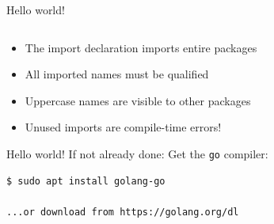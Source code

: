\documentclass[10pt]{beamer}
\begin{document}
	\begin{frame}[fragile]{Hello world!}
		\inputminted{go}{code/01_hello.go}
		\begin{itemize}
			\item The import declaration imports entire packages
			\item All imported names must be qualified
			\item Uppercase names are visible to other packages
			\item Unused imports are compile-time errors!
		\end{itemize}
\end{frame}
	
	
	\begin{frame}[fragile]{Hello world!}
		If not already done: Get the \texttt{go} compiler:
		\begin{verbatim}
$ sudo apt install golang-go

...or download from https://golang.org/dl
		\end{verbatim}
\end{frame}
	
	
	\begin{frame}[fragile]{}
	\end{frame}
\end{document}
